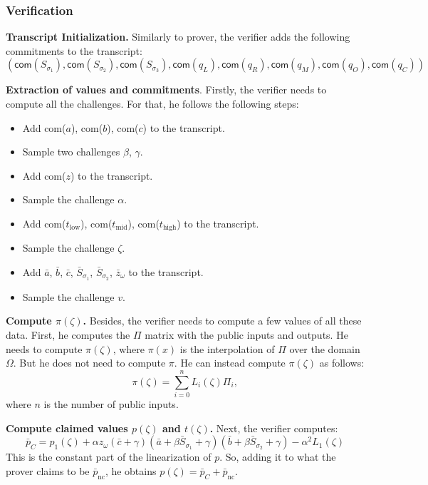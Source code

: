 \documentclass[../lecture-notes-148x210.tex]{subfiles}
\begin{document}
\subsubsection{Verification}

\textcolor{blue!60!black}{\textbf{Transcript Initialization.}} Similarly to
prover, the verifier adds the following commitments to the transcript:
\begin{equation*}
    (\mathsf{com}(S_{\sigma_1}), \mathsf{com}(S_{\sigma_2}), \mathsf{com}(S_{\sigma_3}), \mathsf{com}(q_L), \mathsf{com}(q_R), \mathsf{com}(q_M), \mathsf{com}(q_O), \mathsf{com}(q_C))
\end{equation*}

\textcolor{blue!60!black}{\textbf{Extraction of values and commitments}.}
Firstly, the verifier needs to compute all the challenges. For that, he follows
the following steps:
\begin{itemize}
    \item Add com($a$), com($b$), com($c$) to the transcript.
    \item Sample two challenges $\beta$, $\gamma$.
    \item Add com($z$) to the transcript.
    \item Sample the challenge $\alpha$.
    \item Add com($t_{\text{low}}$), com($t_{\text{mid}}$), com($t_{\text{high}}$) to the transcript.
    \item Sample the challenge $\zeta$.
    \item Add $\bar{a}$, $\bar{b}$, $\bar{c}$, $\bar{S}_{\sigma_1}$, $\bar{S}_{\sigma_2}$, $\bar{z}_{\omega}$ to the transcript.
    \item Sample the challenge $v$.
\end{itemize}

\textcolor{blue!60!black}{\textbf{Compute $\pi(\zeta)$.}} Besides, the verifier
needs to compute a few values of all these data. First, he computes the $\Pi$
matrix with the public inputs and outputs. He needs to compute $\pi(\zeta)$,
where $\pi(x)$ is the interpolation of $\Pi$ over the domain $\Omega$. But he
does not need to compute $\pi$. He can instead compute $\pi(\zeta)$ as follows:
\begin{equation*}
    \pi(\zeta) = \sum_{i=0}^n L_i(\zeta)\Pi_{i},
\end{equation*}
where $n$ is the number of public inputs.

\textcolor{blue!60!black}{\textbf{Compute claimed values $p(\zeta)$ and
$t(\zeta)$.}} Next, the verifier computes: 
\[\bar{p}_C = p_1(\zeta) + \alpha z_{\omega} \left( \bar{c} + \gamma \right)
\left( \bar{a} + \beta \bar{S}_{\sigma_1} + \gamma \right) \left( \bar{b} +
\beta \bar{S}_{\sigma_2} + \gamma \right) - \alpha^2 L_1(\zeta)\] This is the
constant part of the linearization of $p$. So, adding it to what the prover
claims to be $\bar{p}_{\text{nc}}$, he obtains $p(\zeta) = \bar{p}_C + \bar{p}_{\text{nc}}$.
\end{document}
